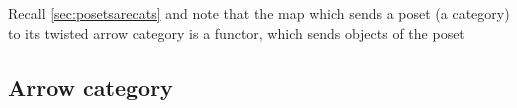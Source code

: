 
\begin{remark}
  Recall \cref{sec:posetsarecats} and note that the map which sends a poset (a category) to its twisted arrow category is a functor, which sends objects of the poset 
\end{remark}

\subsection{Arrow category}

